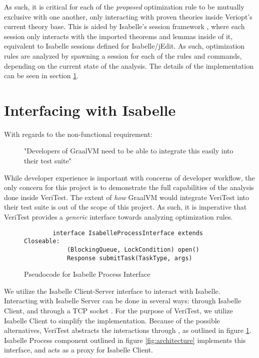 As such, it is critical for each of the \emph{proposed} optimization rule to be mutually exclusive with one another, only interacting with 
proven theories inside Veriopt's current theory base. This is aided by Isabelle's session framework \cite[Ch. 2]{isabelleSystem}, where 
each session only interacts with the imported theorems and lemmas inside of it, equivalent to Isabelle sessions defined for Isabelle/jEdit.
As such, optimization rules are analyzed by spawning a session for each of the rules and commands, depending on the current state of the 
analysis. The details of the implementation can be seen in section \ref{sec:interface}.

\section{Interfacing with Isabelle}
\label{sec:interface}

With regards to the non-functional requirement: 

\begin{figure}[h]
    \centering
    "Developers of GraalVM need to be able to integrate this easily into their test suite"
\end{figure}

While developer experience is important with concerns of developer workflow, the only concern for this project is to demonstrate the full 
capabilities of the analysis done inside VeriTest.
The extent of \emph{how} GraalVM would integrate VeriTest into their test suite is out of the scope of this project. As such, it is imperative 
that VeriTest provides a \emph{generic} interface towards analyzing optimization rules.

\begin{figure}[h]
    \begin{lstlisting}
        interface IsabelleProcessInterface extends Closeable:
            (BlockingQueue, LockCondition) open()
            Response submitTask(TaskType, args)
    \end{lstlisting}

    \caption{Pseudocode for Isabelle Process Interface}
    \label{fig:IsabelleProcessInterface}
\end{figure}

We utilize the Isabelle Client-Server interface to interact with Isabelle. Interacting with Isabelle Server can be done in several ways: 
through Isabelle Client, and through a TCP socket \cite[Ch. 4]{isabelleSystem}. For the purpose of VeriTest, we utilize Isabelle Client to 
simplify the implementation. Because of the possible alternatives, VeriTest abstracts the interactions through , 
as outlined in figure \ref{fig:IsabelleProcessInterface}. Isabelle Process component outlined in figure \ref{fig:architecture} implements 
this interface, and acts as a proxy for Isabelle Client.

